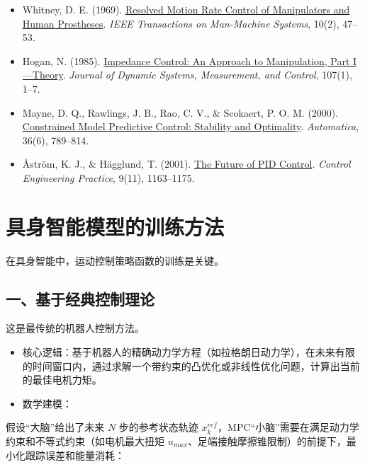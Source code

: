 \begin{itemize}
\item
  Whitney, D. E. (1969). \href{https://ieeexplore.ieee.org/document/4081862/}{Resolved Motion Rate Control of Manipulators and Human Prostheses}. \emph{IEEE Transactions on Man-Machine Systems}, 10(2), 47--53.
\item
  Hogan, N. (1985). \href{https://doi.org/10.1115/1.3140702}{Impedance Control: An Approach to Manipulation, Part I---Theory}. \emph{Journal of Dynamic Systems, Measurement, and Control}, 107(1), 1--7.
\item
  Mayne, D. Q., Rawlings, J. B., Rao, C. V., \& Scokaert, P. O. M. (2000). \href{https://www.sciencedirect.com/science/article/pii/S0005109899002149}{Constrained Model Predictive Control: Stability and Optimality}. \emph{Automatica}, 36(6), 789--814.
\item
  Åström, K. J., \& Hägglund, T. (2001). \href{https://www.sciencedirect.com/science/article/pii/S0967066101000624}{The Future of PID Control}. \emph{Control Engineering Practice}, 9(11), 1163--1175.
\end{itemize}

\clearpage

\hypertarget{ux5177ux8eabux667aux80fdux6a21ux578bux7684ux8badux7ec3ux65b9ux6cd5}{%
\section{具身智能模型的训练方法}\label{ux5177ux8eabux667aux80fdux6a21ux578bux7684ux8badux7ec3ux65b9ux6cd5}}

在具身智能中，运动控制策略函数的训练是关键。

\hypertarget{ux4e00ux57faux4e8eux7ecfux5178ux63a7ux5236ux7406ux8bba}{%
\subsection{一、基于经典控制理论}\label{ux4e00ux57faux4e8eux7ecfux5178ux63a7ux5236ux7406ux8bba}}

这是最传统的机器人控制方法。

\begin{itemize}
\tightlist
\item
  核心逻辑：基于机器人的精确动力学方程（如拉格朗日动力学），在未来有限的时间窗口内，通过求解一个带约束的凸优化或非线性优化问题，计算出当前的最佳电机力矩。
\item
  数学建模：
\end{itemize}

假设``大脑''给出了未来 \(N\) 步的参考状态轨迹 \(x_k^{ref}\)，MPC``小脑''需要在满足动力学约束和不等式约束（如电机最大扭矩 \(u_{max}\)、足端接触摩擦锥限制）的前提下，最小化跟踪误差和能量消耗：

